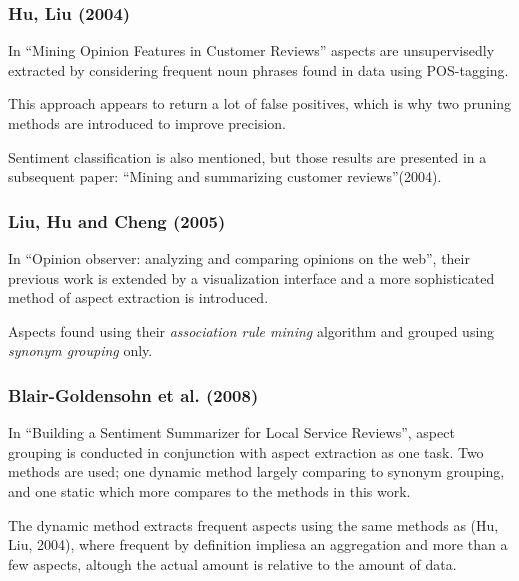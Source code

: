 \documentclass[a4paper,11pt]{kth-mag}
\begin{document}
\subsubsection{Hu, Liu (2004)}
In ``Mining Opinion Features in Customer Reviews'' aspects are unsupervisedly
extracted by considering frequent noun phrases found in data using POS-tagging.

This approach appears to return a lot of false positives, which is why two pruning
methods are introduced to improve precision.

Sentiment classification is also mentioned, but those results are presented in a subsequent paper:
``Mining and summarizing customer reviews''(2004).


\subsubsection{Liu, Hu and Cheng (2005)}
In ``Opinion observer: analyzing and comparing opinions on the web'', their previous work is extended
by a visualization interface and a more sophisticated method of aspect extraction is introduced.

%
%

Aspects found using their \emph{association rule mining}\cite{ma1998integrating} algorithm
and grouped using \emph{synonym grouping} only. %

\subsubsection{Blair-Goldensohn et al. (2008)}
In ``Building a Sentiment Summarizer for Local Service Reviews'', aspect grouping is
conducted in conjunction with aspect extraction as one task.
Two methods are used; one dynamic method largely comparing to synonym grouping,
and one static which more compares to the methods in this work.

The dynamic method extracts frequent aspects using the same methods as (Hu, Liu, 2004),
where frequent by definition impliesa an aggregation and more than a few aspects,
altough the actual amount is relative to the amount of data.
\end{document}

